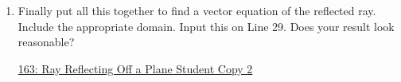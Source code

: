 \documentclass{ximera}
\begin{document}
\begin{question}
\begin{enumerate}


\item Finally put all this together to find a vector equation of the reflected ray. Include the appropriate domain. Input this on Line 29. Does your result look reasonable?


\begin{onlineOnly}
    \begin{center}
\end{center}
\end{onlineOnly}

\href{https://www.desmos.com/3d/znxtexpsnt}{163: Ray Reflecting Off a Plane Student Copy 2}




\end{enumerate}

\end{question}




\end{document}
